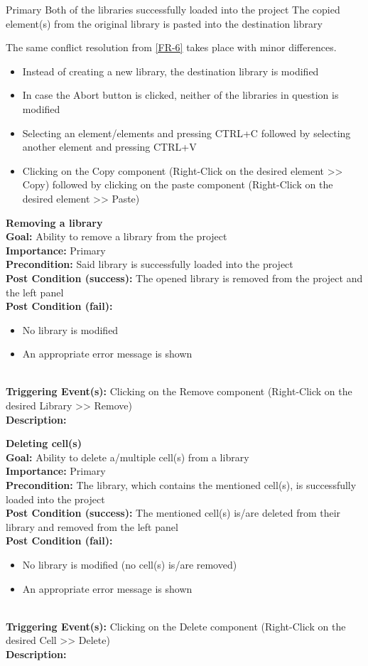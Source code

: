 \documentclass[10pt,a4paper]{report}
\newcommand{\precondition}[1]{
    \textbf{Precondition: } #1 \leavevmode \\
}
\newcommand{\FRDescription}[8]{
    \textbf{#1} \leavevmode \\
    \textbf{Goal: } #2 \leavevmode \\
    \textbf{Importance: } #3 \leavevmode \\
    \precondition{#4}
    \textbf{Post Condition (success): } #5 \leavevmode \\
    \textbf{Post Condition (fail): } #6 \leavevmode \\
    \textbf{Triggering Event(s): } #7 \leavevmode \\
    \textbf{Description: } \leavevmode \\ 
    #8}
\begin{document}
\begin{FR}
    {Primary}
    {Both of the libraries successfully loaded into the project}
    {The copied element(s) from the original library is pasted into the destination library}
    {The same conflict resolution from \ref{FR-6} takes place with minor differences.
    \begin{itemize}
        \item Instead of creating a new library, the destination library is modified
        \item In case the Abort button is clicked, neither of the libraries in question is modified
    \end{itemize}}
    {\begin{itemize}
        \item Selecting an element/elements and pressing CTRL+C followed by selecting another element and pressing CTRL+V
        \item Clicking on the Copy component (Right-Click on the desired element >> Copy) followed by clicking on the paste component (Right-Click on the desired element >> Paste)
    \end{itemize}}
    \item \FRDescription{Removing a library}
    {Ability to remove a library from the project}
    {Primary}
    {Said library is successfully loaded into the project}
    {The opened library is removed from the project and the left panel}
    {\begin{itemize}
        \item No library is modified
        \item An appropriate error message is shown
    \end{itemize}}
    {Clicking on the Remove component (Right-Click on the desired Library  >> Remove)}
    \item \FRDescription{Deleting cell(s)}
    {Ability to delete a/multiple cell(s) from a library}
    {Primary}
    {The library, which contains the mentioned cell(s), is successfully loaded into the project}
    {The mentioned cell(s) is/are deleted from their library and removed from the left panel}
    {\begin{itemize}
        \item No library is modified (no cell(s) is/are removed)
        \item An appropriate error message is shown
    \end{itemize}}
    {Clicking on the Delete component (Right-Click on the desired Cell  >> Delete)}
    \item {}

\end{FR}
\end{document}
